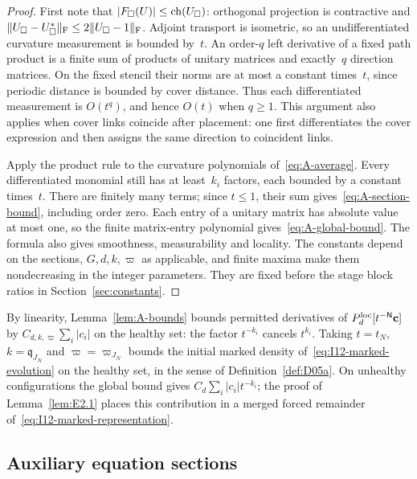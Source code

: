 \begin{proof}
First note that $|F_\square(U)|\le\operatorname{ch}(U_\square)$: orthogonal projection is contractive and $\|U_\square-U_\square^*\|_{\rm F}\le2\|U_\square-1\|_{\rm F}$. Adjoint transport is isometric, so an undifferentiated curvature measurement is bounded by~$t$. An order-$q$ left derivative of a fixed path product is a finite sum of products of unitary matrices and exactly~$q$ direction matrices. On the fixed stencil their norms are at most a constant times~$t$, since periodic distance is bounded by cover distance. Thus each differentiated measurement is $O(t^q)$, and hence $O(t)$ when $q\ge1$. This argument also applies when cover links coincide after placement: one first differentiates the cover expression and then assigns the same direction to coincident links.

Apply the product rule to the curvature polynomials of~\eqref{eq:A-average}. Every differentiated monomial still has at least~$k_i$ factors, each bounded by a constant times~$t$. There are finitely many terms; since $t\le1$, their sum gives~\eqref{eq:A-section-bound}, including order zero. Each entry of a unitary matrix has absolute value at most one, so the finite matrix-entry polynomial gives~\eqref{eq:A-global-bound}. The formula also gives smoothness, measurability and locality. The constants depend on the sections, $G,d,k,\varpi$ as applicable, and finite maxima make them nondecreasing in the integer parameters. They are fixed before the stage block ratios in Section~\ref{sec:constants}.
\end{proof}

By linearity, Lemma~\ref{lem:A-bounds} bounds permitted derivatives of $P_{d}^{\mathrm{loc}}[t^{-\mathsf{N}}\mathbf c]$ by $C_{d,k,\varpi}\sum_i|c_i|$ on the healthy set: the factor $t^{-k_i}$ cancels $t^{k_i}$. Taking $t=t_N$, $k=\mathfrak q_{J_N}$ and $\varpi=\varpi_{J_N}$ bounds the initial marked density of~\eqref{eq:I12-marked-evolution} on the healthy set, in the sense of Definition~\ref{def:D05a}. On unhealthy configurations the global bound gives $C_d\sum_i|c_i|t^{-k_i}$; the proof of Lemma~\ref{lem:E2.1} places this contribution in a merged forced remainder of~\eqref{eq:I12-marked-representation}.

\subsection{Auxiliary equation sections}\label{sec:A-equations}

